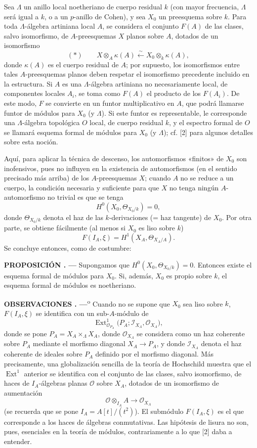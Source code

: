 \documentclass[11pt,twoside,openany]{book}
\numberwithin{equation}{section}
\newcommand{\src}[1]{%
  \phantomsection\hypertarget{src:#1}{}%
  \marginpar{\raggedleft\footnotesize\sffamily #1}%
}
\theoremstyle{plain}
\theoremstyle{definition}
\theoremstyle{remark}
\newcommand{\result}[2]{%
  \par\medskip\noindent\textbf{#1%
  \if\relax\detokenize{#2}\relax\else\space#2\fi. ---}\enspace
}
\newcommand{\FgaUnitKey}{frontmatter}
\renewcommand{\src}[1]{%
  \phantomsection\hypertarget{src:\FgaUnitKey:#1}{}%
  \marginpar{\raggedleft\footnotesize\sffamily #1}%
}
\theoremstyle{plain}
\theoremstyle{definition}
\theoremstyle{remark}
\begin{document}
Sea $\Lambda$ un anillo local noetheriano de cuerpo residual $k$ (con mayor
frecuencia, $\Lambda$ será igual a $k$, o a un $p$-anillo de Cohen), y sea
$X_0$ un preesquema sobre $k$. Para toda $\Lambda$-álgebra artiniana local $A$,
se considera el conjunto $F(A)$ de las clases, salvo isomorfismo, de
$A$-preesquemas $X$ planos sobre $A$, dotados de un isomorfismo
\[
  (*)\qquad
  X\otimes_A\kappa(A)\xleftarrow{\sim}
  X_0\otimes_k\kappa(A),
\]
donde $\kappa(A)$ es el cuerpo residual de $A$; por supuesto, los isomorfismos
entre tales $A$-preesquemas planos deben respetar el isomorfismo precedente
incluido en la estructura. Si $A$ es una $\Lambda$-álgebra artiniana no
necesariamente local, de componentes locales $A_i$, se toma como $F(A)$ el
producto de los $F(A_i)$. De este modo, $F$ se convierte en un funtor
multiplicativo en $A$, que podrá llamarse funtor de módulos para $X_0$ (y
$\Lambda$). Si este funtor es representable, le corresponde una
$\Lambda$-álgebra topológica $O$ local, de cuerpo residual $k$, y el espectro
formal de $O$ se llamará esquema formal de módulos para $X_0$ (y $\Lambda$);
cf. [2] para algunos detalles sobre esta noción.

Aquí, para aplicar la técnica de descenso, los automorfismos «finitos» de $X_0$
son inofensivos, pues no influyen en la existencia de automorfismos (en el
sentido precisado más arriba) de los $A$-preesquemas $X$; cuando $A$ no se
reduce a un cuerpo, la condición necesaria y suficiente para que $X$ no tenga
ningún $A$-automorfismo no trivial es que se tenga
\[
  H^0(X_0,\Theta_{X_0/k})=0,
\]
donde $\Theta_{X_0/k}$ denota el haz de las $k$-derivaciones (= haz tangente)
de $X_0$. Por otra parte, se obtiene fácilmente (al menos si $X_0$ es liso
sobre $k$)
\[
  F(I_A,\xi)=H^1(X_A,\Theta_{X_A/A}).
\]
Se concluye entonces, como de costumbre:

\src{386}
\result{PROPOSICIÓN}{4.1} Supongamos que
$H^0(X_0,\Theta_{X_0/k})=0$. Entonces existe el esquema formal de módulos para
$X_0$. Si, además, $X_0$ es propio sobre $k$, el esquema formal de módulos es
noetheriano.

\result{OBSERVACIONES}{} 1\textsuperscript{o} Cuando no se supone que $X_0$ sea
liso sobre $k$, $F(I_A,\xi)$ se identifica con un sub-$A$-módulo de
\[
  \operatorname{Ext}^1_{\mathcal O_{P_A}}
  \bigl(P_A;\mathcal I_{X_A},\mathcal O_{X_A}\bigr),
\]
donde se pone $P_A=X_A\times_\Lambda X_A$, donde $\mathcal O_{X_A}$ se
considera como un haz coherente sobre $P_A$ mediante el morfismo diagonal
$X_A\longrightarrow P_A$, y donde $\mathcal I_{X_A}$ denota el haz coherente
de ideales sobre $P_A$ definido por el morfismo diagonal. Más precisamente,
una globalización sencilla de la teoría de Hochschild muestra que el
$\operatorname{Ext}^1$ anterior se identifica con el conjunto de las clases,
salvo isomorfismo, de haces de $I_A$-álgebras planas $\mathcal O$ sobre $X_A$,
dotados de un isomorfismo de aumentación
\[
  \mathcal O\otimes_{I_A}A\longrightarrow\mathcal O_{X_A}
\]
(se recuerda que se pone $I_A=A[t]/(t^2)$). El submódulo $F(I_A,\xi)$ es el
que corresponde a los haces de álgebras conmutativas. Las hipótesis de lisura
no son, pues, esenciales en la teoría de módulos, contrariamente a lo que [2]
daba a entender.
\end{document}
